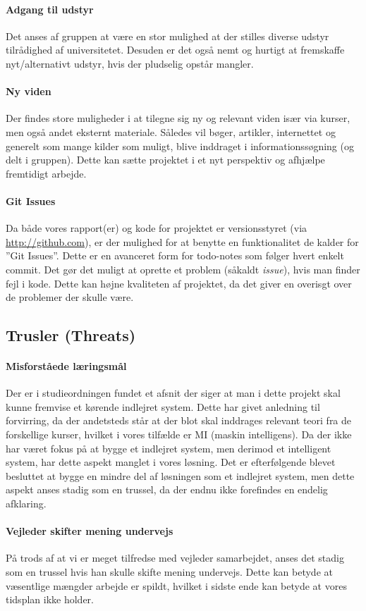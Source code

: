 \paragraph{Adgang til udstyr}
Det anses af gruppen at være en stor mulighed at der stilles diverse udstyr tilrådighed af universitetet.
Desuden er det også nemt og hurtigt at fremskaffe nyt/alternativt udstyr, hvis der pludselig opstår mangler.

\paragraph{Ny viden}\label{swot:ny_viden}
Der findes store muligheder i at tilegne sig ny og relevant viden især via kurser, men også andet eksternt materiale.
Således vil bøger, artikler, internettet og generelt som mange kilder som muligt, blive inddraget i informationssøgning (og delt i gruppen).
Dette kan sætte projektet i et nyt perspektiv og afhjælpe fremtidigt arbejde.

\paragraph{Git Issues}
Da både vores rapport(er) og kode for projektet er versionsstyret (via \url{http://github.com}), er der mulighed for at benytte en funktionalitet de kalder for ''Git Issues''.
Dette er en avanceret form for todo-notes som følger hvert enkelt commit.
Det gør det muligt at oprette et problem (såkaldt \textit{issue}), hvis man finder fejl i kode.
Dette kan højne kvaliteten af projektet, da det giver en overisgt over de problemer der skulle være.

\subsection{Trusler \textnormal{(\textbf{T}hreats)}}

\paragraph{Misforståede læringsmål}\label{swot:laeringsmaal}
Der er i studieordningen fundet et afsnit der siger at man i dette projekt skal kunne fremvise et kørende indlejret system.
Dette har givet anledning til forvirring, da der andetsteds står at der blot skal inddrages relevant teori fra de forskellige kurser, hvilket i vores tilfælde er MI (maskin intelligens).
Da der ikke har været fokus på at bygge et indlejret system, men derimod et intelligent system, har dette aspekt manglet i vores løsning.
Det er efterfølgende blevet besluttet at bygge en mindre del af løsningen som et indlejret system, men dette aspekt anses stadig som en trussel, da der endnu ikke forefindes en endelig afklaring.

\paragraph{Vejleder skifter mening undervejs}\label{swot:vejleder}
På trods af at vi er meget tilfredse med vejleder samarbejdet, anses det stadig som en trussel hvis han skulle skifte mening undervejs.
Dette kan betyde at væsentlige mængder arbejde er spildt, hvilket i sidste ende kan betyde at vores tidsplan ikke holder.
